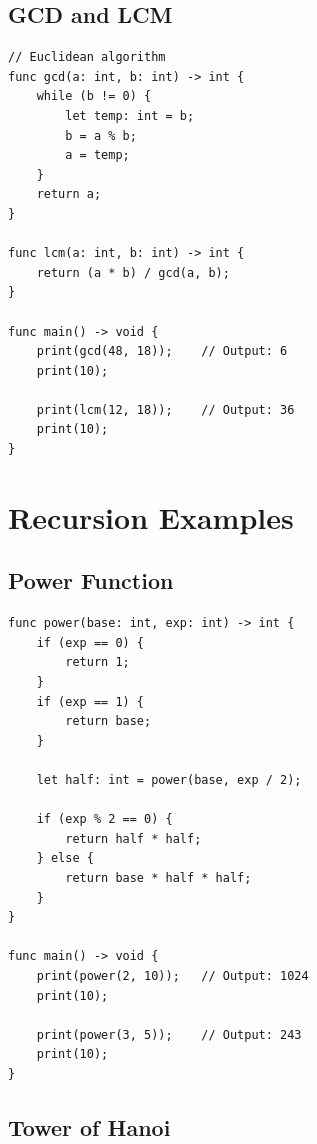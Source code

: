 \documentclass[12pt,a4paper,oneside]{book}
\begin{document}
\subsection{GCD and LCM}

\begin{lstlisting}[style=algo, caption={Greatest Common Divisor}]
// Euclidean algorithm
func gcd(a: int, b: int) -> int {
    while (b != 0) {
        let temp: int = b;
        b = a % b;
        a = temp;
    }
    return a;
}

func lcm(a: int, b: int) -> int {
    return (a * b) / gcd(a, b);
}

func main() -> void {
    print(gcd(48, 18));    // Output: 6
    print(10);
    
    print(lcm(12, 18));    // Output: 36
    print(10);
}
\end{lstlisting}

\section{Recursion Examples}

\subsection{Power Function}

\begin{lstlisting}[style=algo, caption={Exponentiation by Recursion}]
func power(base: int, exp: int) -> int {
    if (exp == 0) {
        return 1;
    }
    if (exp == 1) {
        return base;
    }
    
    let half: int = power(base, exp / 2);
    
    if (exp % 2 == 0) {
        return half * half;
    } else {
        return base * half * half;
    }
}

func main() -> void {
    print(power(2, 10));   // Output: 1024
    print(10);
    
    print(power(3, 5));    // Output: 243
    print(10);
}
\end{lstlisting}

\subsection{Tower of Hanoi}
\end{document}
